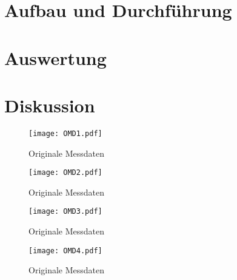 

\setlength{\parindent}{0em}


%
%

\tableofcontents
\newpage



\newpage



\section{Aufbau und Durchführung}

\newpage

\section{Auswertung}

\newpage

\section{Diskussion}

\newpage

\newpage

\begin{figure}
  \centering
  \texttt{[image: OMD1.pdf]}
  \caption{Originale Messdaten}
\end{figure}

\begin{figure}
  \centering
  \texttt{[image: OMD2.pdf]}
  \caption{Originale Messdaten}
\end{figure}

\begin{figure}
  \centering
  \texttt{[image: OMD3.pdf]}
  \caption{Originale Messdaten}
\end{figure}

\begin{figure}
  \centering
  \texttt{[image: OMD4.pdf]}
  \caption{Originale Messdaten}
\end{figure}

%


\nocite{*}
\printbibliography


